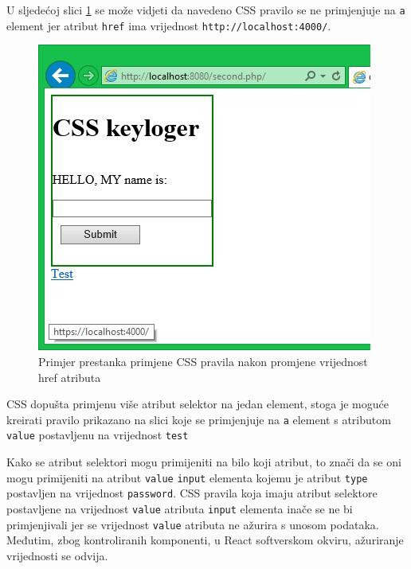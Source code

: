 \documentclass[12pt, oneside, onecolumn]{book}
\begin{document}
{U sljedećoj slici \ref{fig:css_ex2} se može vidjeti da navedeno CSS pravilo se ne primjenjuje na \texttt{a} element jer atribut \texttt{href} ima vrijednost \texttt{http://localhost:4000/}.

\begin{figure}[H]
	\begin{center}
		\includegraphics[width=\textwidth]{css_ex2.jpg}
		\caption{Primjer prestanka primjene CSS pravila nakon promjene vrijednost href atributa} \label{fig:css_ex2}
	\end{center}
\end{figure}

CSS dopušta primjenu više atribut selektor na jedan element, stoga je moguće kreirati pravilo prikazano na slici  koje se primjenjuje na \texttt{a} element s atributom \texttt{value} postavljenu na vrijednost \texttt{test} 

Kako se atribut selektori mogu primijeniti na bilo koji atribut, to znači da se oni mogu primijeniti na atribut \texttt{value} \texttt{input} elementa kojemu je atribut \texttt{type} postavljen na vrijednost \texttt{password}. CSS pravila koja imaju atribut selektore postavljene na vrijednost \texttt{value} atributa \texttt{input} elementa inače se ne bi primjenjivali jer se vrijednost \texttt{value} atributa ne ažurira s unosom podataka. Međutim, zbog kontroliranih komponenti, u React softverskom okviru, ažuriranje vrijednosti se odvija.

}
\end{document}
